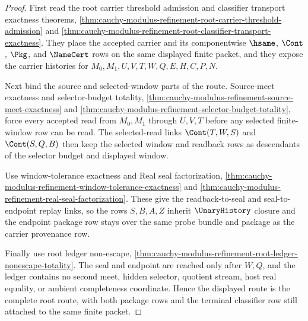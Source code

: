 \begin{proof}
First read the root carrier threshold admission and classifier transport exactness theorems, \autoref{thm:cauchy-modulus-refinement-root-carrier-threshold-admission} and \autoref{thm:cauchy-modulus-refinement-root-classifier-transport-exactness}. They place the accepted carrier and its componentwise $\hsame$, $\Cont$, $\Pkg$, and $\NameCert$ rows on the same displayed finite packet, and they expose the carrier histories for $M_0,M_1,U,V,T,W,Q,E,H,C,P,N$.

Next bind the source and selected-window parts of the route. Source-meet exactness and selector-budget totality, \autoref{thm:cauchy-modulus-refinement-source-meet-exactness} and \autoref{thm:cauchy-modulus-refinement-selector-budget-totality}, force every accepted read from $M_0,M_1$ through $U,V,T$ before any selected finite-window row can be read. The selected-read links $\Cont(T,W,S)$ and $\Cont(S,Q,B)$ then keep the selected window and readback rows as descendants of the selector budget and displayed window.

Use window-tolerance exactness and Real seal factorization, \autoref{thm:cauchy-modulus-refinement-window-tolerance-exactness} and \autoref{thm:cauchy-modulus-refinement-real-seal-factorization}. These give the readback-to-seal and seal-to-endpoint replay links, so the rows $S,B,A,Z$ inherit $\UnaryHistory$ closure and the endpoint package row stays over the same probe bundle and package as the carrier provenance row.

Finally use root ledger non-escape, \autoref{thm:cauchy-modulus-refinement-root-ledger-nonescape-totality}. The seal and endpoint are reached only after $W,Q$, and the ledger contains no second meet, hidden selector, quotient stream, host real equality, or ambient completeness coordinate. Hence the displayed route is the complete root route, with both package rows and the terminal classifier row still attached to the same finite packet.
\end{proof}

